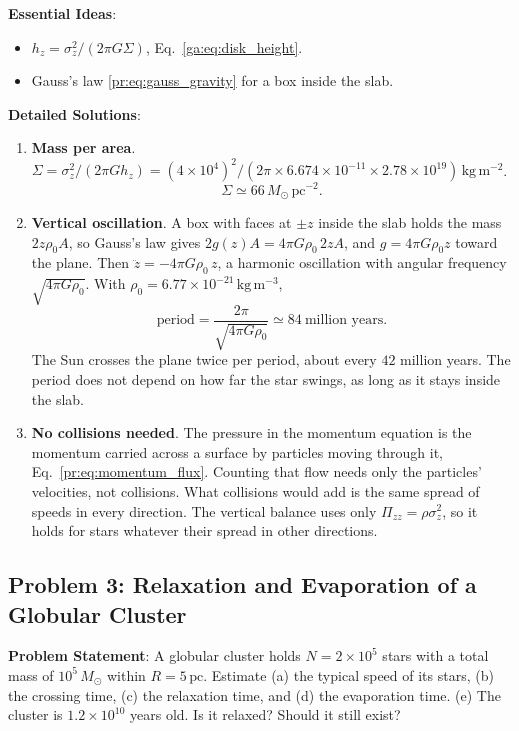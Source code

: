 \textbf{Essential Ideas}:
\begin{itemize}
	\item $h_z=\sigma_z^2/(2\pi G\Sigma)$, Eq.~\eqref{ga:eq:disk_height}.
	\item Gauss's law \eqref{pr:eq:gauss_gravity} for a box inside the slab.
\end{itemize}

\textbf{Detailed Solutions}:
\begin{enumerate}[label=(\alph*)]
	\item \textbf{Mass per area}. $\Sigma=\sigma_z^2/(2\pi Gh_z)=(4\times10^4)^2/(2\pi\times6.674\times10^{-11}\times2.78\times10^{19})\,\mathrm{kg\,m^{-2}}$.
	\[
	\boxed{\Sigma\simeq66\,M_\odot\,\mathrm{pc^{-2}}.}
	\]
	\item \textbf{Vertical oscillation}. A box with faces at $\pm z$ inside the slab holds the mass $2z\rho_0A$, so Gauss's law gives $2g(z)A=4\pi G\rho_0\,2zA$, and $g=4\pi G\rho_0z$ toward the plane. Then $\ddot z=-4\pi G\rho_0\,z$, a harmonic oscillation with angular frequency $\sqrt{4\pi G\rho_0}$. With $\rho_0=6.77\times10^{-21}\,\mathrm{kg\,m^{-3}}$,
	\[
	\boxed{\text{period}=\frac{2\pi}{\sqrt{4\pi G\rho_0}}\simeq84\ \text{million years}.}
	\]
	The Sun crosses the plane twice per period, about every $42$ million years. The period does not depend on how far the star swings, as long as it stays inside the slab.
	\item \textbf{No collisions needed}. The pressure in the momentum equation is the momentum carried across a surface by particles moving through it, Eq.~\eqref{pr:eq:momentum_flux}. Counting that flow needs only the particles' velocities, not collisions. What collisions would add is the same spread of speeds in every direction. The vertical balance uses only $\Pi_{zz}=\rho\sigma_z^2$, so it holds for stars whatever their spread in other directions.
\end{enumerate}

\subsection{Problem 3: Relaxation and Evaporation of a Globular Cluster}
\label{ga:prob:gc}

\textbf{Problem Statement}: A globular cluster holds $N=2\times10^5$ stars with a total mass of $10^5\,M_\odot$ within $R=5\,\mathrm{pc}$. Estimate (a) the typical speed of its stars, (b) the crossing time, (c) the relaxation time, and (d) the evaporation time. (e) The cluster is $1.2\times10^{10}$ years old. Is it relaxed? Should it still exist?

